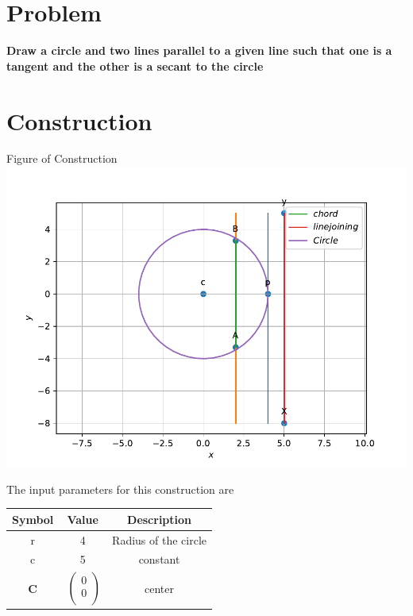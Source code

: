 \documentclass[10pt, a4paper]{article}
\begin{document}
\title{\mytitle}
\author{\myauthor\hspace{1em}\\\contact\\FWC22008\hspace{6.5em}IITH\hspace{0.5em}\mymodule\hspace{6em}ASSIGN-5}
\date{}
	\maketitle
		
	\tableofcontents
\vspace{5mm}
   \section{Problem}
\textbf{ Draw a circle and two lines parallel to a given line such that one is a tangent and the other is a secant to the circle }
 \section{Construction}
 	\begin{center}
     Figure of Construction
     \includegraphics[scale=0.5]{figs/fig.pdf} 
  	\end{center}
  	The input parameters for this construction are 
\begin{center}
\begin{tabular}{|c|c|c|}
	\hline
	\textbf{Symbol}&\textbf{Value}&\textbf{Description}\\
	\hline
	r&4&Radius of the circle\\
	\hline		
	c&5&constant \\
	\hline
	\textbf{C}&$\
	\begin{pmatrix}
		0 \\
		0 \\
	\end{pmatrix}$
	&center\\
	\hline
	
\end{tabular}
\end{center}
\end{document}
